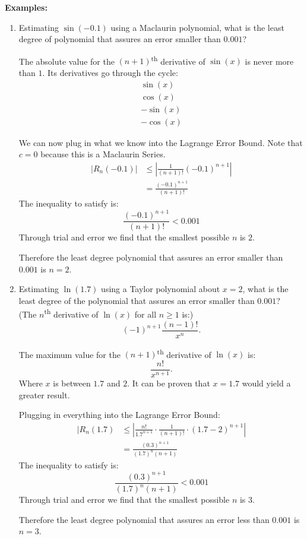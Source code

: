 \documentclass[12pt]{article}
\begin{document}
\noindent \textbf{Examples:}
\begin{enumerate}
	\item Estimating $\sin(-0.1)$ using a Maclaurin polynomial, what is the least degree of polynomial that assures an error smaller than $0.001$?

	      The absolute value for the $(n+1)$\textsuperscript{th} derivative of $\sin(x)$ is never more than $1$. Its derivatives go through the cycle:
	      \begin{gather*}
		      \sin(x) \\
		      \cos(x) \\
		      -\sin(x) \\
		      -\cos(x)
	      \end{gather*}

	      We can now plug in what we know into the Lagrange Error Bound. Note that $c=0$ because this is a Maclaurin Series.
	      \begin{align*}
		      |R_n(-0.1)| & \le \left| \frac{1}{(n+1)!} (-0.1)^{n+1} \right| \\
		      & = \frac{(-0.1)^{n+1}}{(n+1)!}
	      \end{align*}
	      The inequality to satisfy is:
	      \[ \frac{(-0.1)^{n+1}}{(n+1)!} < 0.001 \]
	      Through trial and error we find that the smallest possible $n$ is $2$.

	      Therefore the least degree polynomial that assures an error smaller than $0.001$ is $n=2$.
	      \bigskip

	\item Estimating $\ln(1.7)$ using a Taylor polynomial about $x=2$, what is the least degree of the polynomial that assures an error smaller than $0.001$?
	      \\ (The $n$\textsuperscript{th} derivative of $\ln(x)$ for all $n \ge 1$ is:)
	      \[ (-1)^{n+1} \frac{(n-1)!}{x^n}. \]

	      The maximum value for the $(n+1)$\textsuperscript{th} derivative of $\ln(x)$ is:
	      \[ \frac{n!}{x^{n+1}}. \]
	      Where $x$ is between $1.7$ and $2$. It can be proven that $x=1.7$ would yield a greater result.

	      Plugging in everything into the Lagrange Error Bound:
	      \begin{align*}
		      |R_n(1.7) & \le \left| \frac{n!}{1.7^{n+1}} \cdot \frac{1}{(n+1)!} \cdot (1.7-2)^{n+1} \right| \\[6pt]
		      & = \frac{(0.3)^{n+1}}{(1.7)^n (n+1)}
	      \end{align*}
	      The inequality to satisfy is:
	      \[ \frac{(0.3)^{n+1}}{(1.7)^n (n+1)} < 0.001 \]
	      Through trial and error we find that the smallest possible $n$ is $3$.

	      Therefore the least degree polynomial that assures an error less than $0.001$ is $n=3$.
\end{enumerate}
\end{document}
